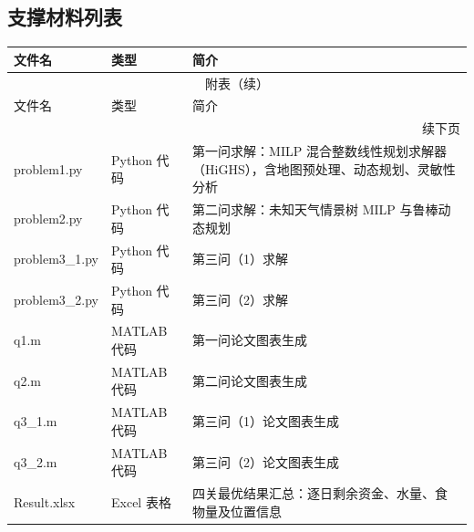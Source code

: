 \documentclass{cumcmthesis}
\numberwithin{equation}{section}
\numberwithin{figure}{section}
\numberwithin{table}{section}
\begin{document}
\begin{appendices}
\section{支撑材料列表}
\begin{longtable}{p{} p{} p{}}
\toprule
文件名 & 类型 & 简介 \\
\midrule
\endfirsthead
\multicolumn{3}{c}{附表（续）} \\
\toprule
文件名 & 类型 & 简介 \\
\midrule
\endhead
\multicolumn{3}{r}{续下页} \\
\endfoot
\bottomrule
\endlastfoot
problem1.py & Python 代码 & 第一问求解：MILP 混合整数线性规划求解器（HiGHS），含地图预处理、动态规划、灵敏性分析 \\
problem2.py & Python 代码 & 第二问求解：未知天气情景树 MILP 与鲁棒动态规划 \\
problem3\_1.py & Python 代码 & 第三问（1）求解\\
problem3\_2.py & Python 代码 & 第三问（2）求解 \\
q1.m & MATLAB 代码 & 第一问论文图表生成 \\
q2.m & MATLAB 代码 & 第二问论文图表生成 \\
q3\_1.m & MATLAB 代码 & 第三问（1）论文图表生成 \\
q3\_2.m & MATLAB 代码 & 第三问（2）论文图表生成 \\
Result.xlsx & Excel 表格 & 四关最优结果汇总：逐日剩余资金、水量、食物量及位置信息 \\
\end{longtable}

\newpage

\end{appendices}
\end{document}
